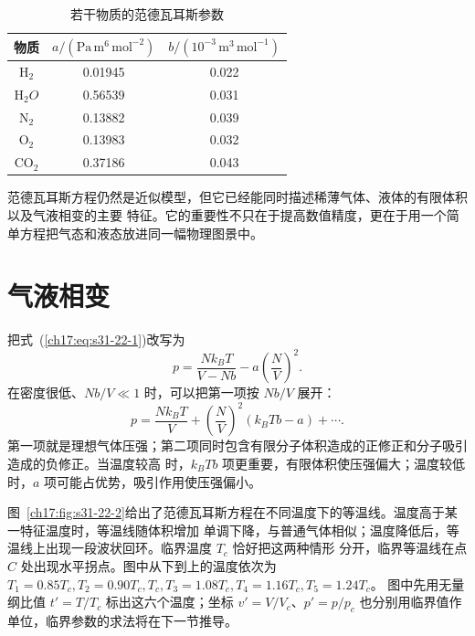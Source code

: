 {\begin{table}[htbp]
  \centering
  \caption{若干物质的范德瓦耳斯参数}\label{ch17:tab:s31-22-1}
  \renewcommand{\arraystretch}{1.12}
  \begin{tabular}{ccc}
    \toprule
    物质 & $a/(\mathrm{Pa\,m^6\,mol^{-2}})$ & $b/(10^{-3}\,\mathrm{m^3\,mol^{-1}})$ \\
    \midrule
    $\mathrm H_2$   & 0.01945 & 0.022 \\
    $\mathrm H_2O$ & 0.56539 & 0.031 \\
    $\mathrm N_2$  & 0.13882 & 0.039 \\
    $\mathrm O_2$  & 0.13983 & 0.032 \\
    $\mathrm{CO}_2$& 0.37186 & 0.043 \\
    \bottomrule
  \end{tabular}
\end{table}

范德瓦耳斯方程仍然是近似模型，但它已经能同时描述稀薄气体、液体的有限体积以及气液相变的主要
特征。它的重要性不只在于提高数值精度，更在于用一个简单方程把气态和液态放进同一幅物理图景中。

\section{气液相变}

把式~(\ref{ch17:eq:s31-22-1})改写为
\[
  p=\frac{Nk_BT}{V-Nb}-a\left(\frac NV\right)^2.
\]
在密度很低、$Nb/V\ll1$ 时，可以把第一项按 $Nb/V$ 展开：
\begin{equation}
  \boxed{p=\frac{Nk_BT}{V}
  +\left(\frac NV\right)^2(k_BT b-a)+\cdots }.
  \label{ch17:eq:s31-22-2}
\end{equation}
第一项就是理想气体压强；第二项同时包含有限分子体积造成的正修正和分子吸引造成的负修正。当温度较高
时，$k_BT b$ 项更重要，有限体积使压强偏大；温度较低时，$a$ 项可能占优势，吸引作用使压强偏小。

图~\ref{ch17:fig:s31-22-2}给出了范德瓦耳斯方程在不同温度下的等温线。温度高于某一特征温度时，等温线随体积增加
单调下降，与普通气体相似；温度降低后，等温线上出现一段波状回环。临界温度 $T_c$ 恰好把这两种情形
分开，临界等温线在点 $C$ 处出现水平拐点。图中从下到上的温度依次为
$T_1=0.85T_c,T_2=0.90T_c,T_c,T_3=1.08T_c,T_4=1.16T_c,T_5=1.24T_c$。
图中先用无量纲比值 $t'=T/T_c$ 标出这六个温度；坐标 $v'=V/V_c$、$p'=p/p_c$
也分别用临界值作单位，临界参数的求法将在下一节推导。

\par\noindent\begin{minipage}{\linewidth}
\vdWIsotherms
{}\label{ch17:fig:s31-22-2}
\end{minipage}\par\medskip

}
